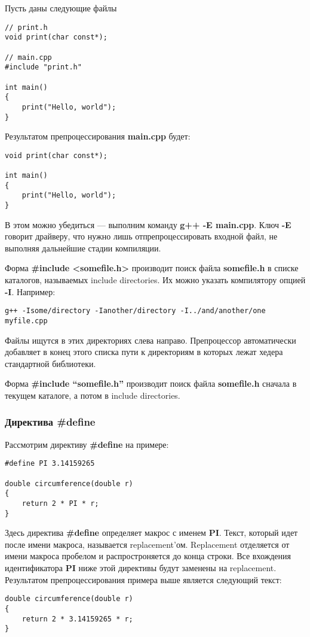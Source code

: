 Пусть даны следующие файлы
\begin{verbatim}
// print.h
void print(char const*);

// main.cpp
#include "print.h"

int main()
{
    print("Hello, world");
}
\end{verbatim}
Результатом препроцессирования {\bf main.cpp} будет:
\begin{verbatim}
void print(char const*);

int main()
{
    print("Hello, world");
}
\end{verbatim}
В этом можно убедиться --- выполним команду {\bf g++ -E main.cpp}. Ключ {\bf -E} говорит драйверу, что нужно лишь отпрепроцессировать входной файл, не выполняя дальнейшие стадии компиляции.

Форма {\bf \#include <somefile.h>} производит поиск файла {\bf somefile.h} в списке каталогов, называемых include directories. Их можно указать компилятору опцией {\bf -I}. Например:
\begin{verbatim}
g++ -Isome/directory -Ianother/directory -I../and/another/one myfile.cpp
\end{verbatim}
Файлы ищутся в этих директориях слева направо. Препроцессор автоматически добавляет в конец этого списка пути к директориям в которых лежат хедера стандартной библиотеки.

Форма {\bf \#include ``somefile.h''} производит поиск файла {\bf somefile.h} сначала в текущем каталоге, а потом в include directories.

\subsubsection{Директива \#define}

Рассмотрим директиву {\bf \#define} на примере:
\begin{verbatim}
#define PI 3.14159265

double circumference(double r)
{
    return 2 * PI * r;
}
\end{verbatim}
Здесь директива {\bf \#define} определяет макрос с именем {\bf PI}. Текст, который идет после имени макроса, называется replacement'ом. Replacement отделяется от имени макроса пробелом и распростроняется до конца строки. Все вхождения идентификатора {\bf PI} ниже этой директивы будут заменены на replacement. Результатом препроцессирования примера выше является следующий текст:
\begin{verbatim}
double circumference(double r)
{
    return 2 * 3.14159265 * r;
}
\end{verbatim}

